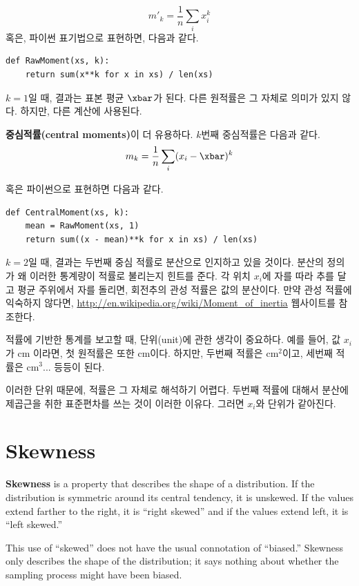%
\[ m'_k = \frac{1}{n} \sum_i x_i^k \]
%
혹은, 파이썬 표기법으로 표현하면, 다음과 같다.

\begin{verbatim}
def RawMoment(xs, k):
    return sum(x**k for x in xs) / len(xs)
\end{verbatim}

$k=1$일 때, 결과는 표본 평균 $\xbar$가 된다.
다른 원적률은 그 자체로 의미가 있지 않다. 하지만, 다른 계산에 사용된다.

{\bf 중심적률(central moments)}이 더 유용하다. 
$k$번째 중심적률은 다음과 같다.
%
\[ m_k = \frac{1}{n} \sum_i (x_i - \xbar)^k \]
%

혹은 파이썬으로 표현하면 다음과 같다.

\begin{verbatim}
def CentralMoment(xs, k):
    mean = RawMoment(xs, 1)
    return sum((x - mean)**k for x in xs) / len(xs)
\end{verbatim}

$k=2$일 때, 결과는 두번째 중심 적률로 분산으로 인지하고 있을 것이다.
분산의 정의가 왜 이러한 통계량이 적률로 불리는지 힌트를 준다.
각 위치 $x_i$에 자를 따라 추를 달고 평균 주위에서 자를 돌리면, 
회전추의 관성 적률은 값의 분산이다. 만약 관성 적률에 익숙하지 않다면,
\url{http://en.wikipedia.org/wiki/Moment_of_inertia} 웹사이트를 참조한다.  

적률에 기반한 통계를 보고할 때, 단위(unit)에 관한 생각이 중요하다.
예를 들어, 값 $x_i$가 cm 이라면, 첫 원적률은 또한 cm이다.
하지만, 두번째 적률은 cm$^2$이고, 세번째 적률은 cm$^3$... 등등이 된다.

이러한 단위 때문에, 적률은 그 자체로 해석하기 어렵다.
두번째 적률에 대해서 분산에 제곱근을 취한 표준편차를 쓰는 것이 이러한 이유다. 
그러면 $x_i$와 단위가 같아진다.


\section{Skewness}

{\bf Skewness} is a property that describes the shape of a distribution.
If the distribution is symmetric around its central tendency, it is
unskewed.  If the values extend farther to the right, it is ``right
skewed'' and if the values extend left, it is ``left skewed.''

This use of ``skewed'' does not have the usual connotation of
``biased.''  Skewness only describes the shape of the distribution;
it says nothing about whether the sampling process might have been
biased.


